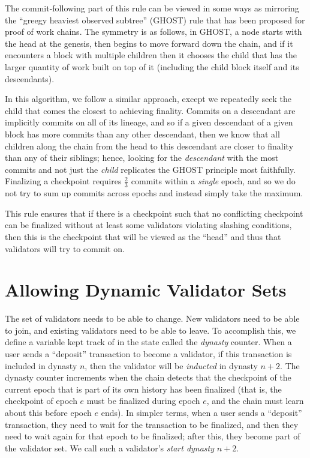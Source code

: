 \documentclass[12pt, final]{article}
\newcommand{\epoch}{\ensuremath{e}\xspace}
\begin{document}
The commit-following part of this rule can be viewed in some ways as mirroring the ``greegy heaviest observed subtree'' (GHOST) rule that has been proposed for proof of work chains\cite{sompolinsky2013accelerating}. The symmetry is as follows, in GHOST, a node starts with the head at the genesis, then begins to move forward down the chain, and if it encounters a block with multiple children then it chooses the child that has the larger quantity of work built on top of it (including the child block itself and its descendants).

In this algorithm, we follow a similar approach, except we repeatedly seek the child that comes the closest to achieving finality. Commits on a descendant are implicitly commits on all of its lineage, and so if a given descendant of a given block has more commits than any other descendant, then we know that all children along the chain from the head to this descendant are closer to finality than any of their siblings; hence, looking for the \textit{descendant} with the most commits and not just the \textit{child} replicates the GHOST principle most faithfully. Finalizing a checkpoint requires $\frac{2}{3}$ commits within a \textit{single} epoch, and so we do not try to sum up commits across epochs and instead simply take the maximum.

This rule ensures that if there is a checkpoint such that no conflicting checkpoint can be finalized without at least some validators violating slashing conditions, then this is the checkpoint that will be viewed as the ``head'' and thus that validators will try to commit on.

\section{Allowing Dynamic Validator Sets}
\label{sect:join_and_leave}

The set of validators needs to be able to change.  New validators need to be able to join, and existing validators need to be able to leave.  To accomplish this, we define a variable kept track of in the state called the \textit{dynasty} counter. When a user sends a ``deposit'' transaction to become a validator, if this transaction is included in dynasty $n$, then the validator will be \textit{inducted} in dynasty $n+2$. The dynasty counter increments when the chain detects that the checkpoint of the current epoch that is part of its own history has been finalized (that is, the checkpoint of epoch \epoch must be finalized during epoch \epoch, and the chain must learn about this before epoch \epoch ends). In simpler terms, when a user sends a ``deposit'' transaction, they need to wait for the transaction to be finalized, and then they need to wait again for that epoch to be finalized; after this, they become part of the validator set. We call such a validator's \textit{start dynasty} $n+2$. 
\end{document}
